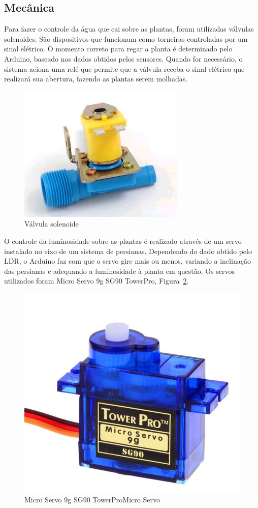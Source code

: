 \documentclass[a4paper,12pt]{report}
\begin{document}
		\subsection{Mecânica}
			Para fazer o controle da água que cai sobre as plantas, foram utilizadas válvulas solenoides. São dispositivos que funcionam como torneiras controladas por um sinal elétrico. O momento correto para regar a planta é determinado pelo Arduino, baseado nos dados obtidos pelos sensores. Quando for necessário, o sistema aciona uma relé que permite que a válvula receba o sinal elétrico que realizará sua abertura, fazendo as plantas serem molhadas.	
			
			\begin{figure}[!htb]
				\centering
				\includegraphics{valvula}
				\caption{Válvula solenoide}
				\label{Rotulo}
			\end{figure}
		
			O controle da luminosidade sobre as plantas é realizado através de um servo instalado no eixo de um sistema de persianas. Dependendo do dado obtido pelo LDR, o Arduino faz com que o servo gire mais ou menos, variando a inclinação das persianas e adequando a luminosidade à planta em questão. Os servos utilizados foram Micro Servo 9g SG90 TowerPro, Figura~\ref{fig:SERVO}. 
			
				
			\begin{figure}
				\centering
				\includegraphics[width=0.4\linewidth]{figs/servo}
				\caption{Micro Servo 9g SG90 TowerProMicro Servo}
				\label{fig:SERVO}
			\end{figure}
		
\end{document}
